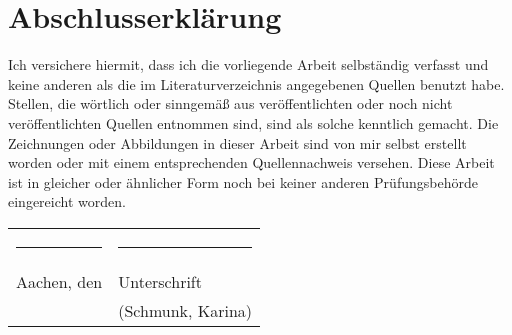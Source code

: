 \chapter*{Abschlusserklärung}
 \thispagestyle{empty}

Ich versichere hiermit, dass ich die vorliegende Arbeit selbständig verfasst und keine anderen als die im Literaturverzeichnis angegebenen Quellen benutzt habe.
Stellen, die wörtlich oder sinngemäß aus veröffentlichten oder noch nicht veröffentlichten Quellen entnommen sind, sind als solche kenntlich gemacht.
Die Zeichnungen oder Abbildungen in dieser Arbeit sind von mir selbst erstellt worden oder mit einem entsprechenden Quellennachweis versehen.
Diese Arbeit ist in gleicher oder ähnlicher Form noch bei keiner anderen Prüfungsbehörde eingereicht worden.
\\[3\normalbaselineskip]
\begin{tabular}{p{} l}
  \rule{\textwidth/3}{0.4pt}   &   \rule{\textwidth/3}{0.4pt} \\
  Aachen, den                  &   Unterschrift
  \\
                               &   (Schmunk, Karina)
\end{tabular}
